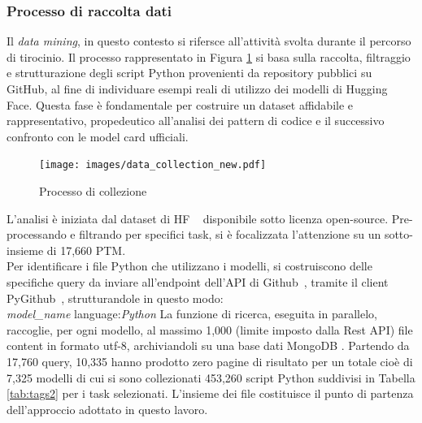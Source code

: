 \documentclass{article}
\begin{document}
\subsubsection{Processo di raccolta dati} \label{tirocinio}
Il \textit{data mining}, in questo contesto si rifersce all'attività svolta durante il percorso di tirocinio. Il processo rappresentato in Figura \ref{fig:tirocinio} si basa sulla raccolta, filtraggio e strutturazione degli script Python provenienti da repository pubblici su GitHub, al fine di individuare esempi reali di utilizzo dei modelli di Hugging Face. Questa fase è fondamentale per costruire un dataset affidabile e rappresentativo, propedeutico all'analisi dei pattern di codice e il successivo confronto con le model card ufficiali.
\begin{figure}[htbp]
    \centering
    \texttt{[image: images/data\_collection\_new.pdf]}
    \caption{Processo di collezione~\cite{CodeXHug}}
    \label{fig:tirocinio}
\end{figure}
L'analisi è iniziata dal dataset di HF ~\cite{ait_hfcommunity_2023} disponibile sotto licenza open-source. Pre-processando e filtrando per specifici task, si è focalizzata l'attenzione su un sotto-insieme di 17,660 PTM.\\
Per identificare i file Python che utilizzano i modelli, si costruiscono delle specifiche query da inviare all'endpoint dell'API di Github~\cite{github_rest}, tramite il client PyGithub~\cite{pygithub}, strutturandole in questo modo:\\
\emph{model\_name} language:\emph{Python}
La funzione di ricerca, eseguita in parallelo, raccoglie, per ogni modello, al massimo 1,000 (limite imposto dalla Rest API) file content in formato utf-8, archiviandoli su una base dati MongoDB \cite{pymongo}. 
Partendo da 17,760 query, 10,335 hanno prodotto zero pagine di risultato per un totale cioè di 7,325 modelli di cui si sono collezionati 453,260 script Python suddivisi in Tabella \ref{tab:tags2} per i task selezionati. L'insieme dei file costituisce il punto di partenza dell'approccio adottato in questo lavoro.\\
\end{document}
